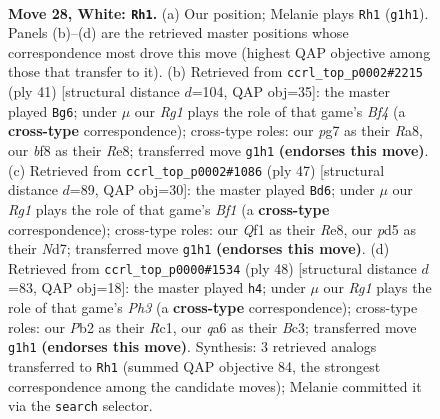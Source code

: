 \documentclass[11pt]{article}
\begin{document}
\clearpage

\begin{figure}[p]\centering
\begin{subfigure}{0.46\textwidth}\centering
\resizebox{\linewidth}{!}{%
\newchessgame
\chessboard[
  setfen={rk3b2/pp4pr/q1p1b2p/P2p1p2/3P3P/2B1PN2/1PK2PP1/1R3QR1 w - - 7 28},
  showmover=false,
  pgfstyle=straightmove, color=movearrow, markmove={g1-h1}
]}
\caption{}
\end{subfigure}\hfill
\begin{subfigure}{0.46\textwidth}\centering
\resizebox{\linewidth}{!}{%
\newchessgame
\chessboard[
  setfen={r3r1k1/p2q1pbp/1p1p1n2/P1pP1b1p/2P4B/2N2B2/1P1Q1PP1/R4RK1 b - - 0 21},
  showmover=false,
  pgfstyle=straightmove, color=movearrow, markmove={f5-g6}
]}
\caption{}
\end{subfigure}
\\[4pt]
\begin{subfigure}{0.46\textwidth}\centering
\resizebox{\linewidth}{!}{%
\newchessgame
\chessboard[
  setfen={r3rbk1/3n1p1p/1q4p1/p1pP4/1p3B2/1P2RB2/P1Q2PPP/5RK1 b - - 2 24},
  showmover=false,
  pgfstyle=straightmove, color=movearrow, markmove={f8-d6}
]}
\caption{}
\end{subfigure}\hfill
\begin{subfigure}{0.46\textwidth}\centering
\resizebox{\linewidth}{!}{%
\newchessgame
\chessboard[
  setfen={4rbk1/1q3pp1/r1p1pn1p/p2p4/N2P4/2B1P1PP/PPR1QPK1/2R5 w - - 7 25},
  showmover=false,
  pgfstyle=straightmove, color=movearrow, markmove={h3-h4}
]}
\caption{}
\end{subfigure}
\caption{\textbf{Move 28, White: \texttt{Rh1}.} (a) Our position; Melanie plays \texttt{Rh1} (\texttt{g1h1}). Panels (b)--(d) are the retrieved master positions whose correspondence most drove this move (highest QAP objective among those that transfer to it). (b) Retrieved from \texttt{ccrl\_top\_p0002\#2215} (ply 41) [structural distance $d$=104, QAP obj=35]: the master played \texttt{Bg6}; under $\mu$ our \emph{Rg1} plays the role of that game's \emph{Bf4} (a \textbf{cross-type} correspondence); cross-type roles: our \emph{p}g7 as their \emph{R}a8, our \emph{b}f8 as their \emph{R}e8; transferred move \texttt{g1h1} \textbf{(endorses this move)}. (c) Retrieved from \texttt{ccrl\_top\_p0002\#1086} (ply 47) [structural distance $d$=89, QAP obj=30]: the master played \texttt{Bd6}; under $\mu$ our \emph{Rg1} plays the role of that game's \emph{Bf1} (a \textbf{cross-type} correspondence); cross-type roles: our \emph{Q}f1 as their \emph{R}e8, our \emph{p}d5 as their \emph{N}d7; transferred move \texttt{g1h1} \textbf{(endorses this move)}. (d) Retrieved from \texttt{ccrl\_top\_p0000\#1534} (ply 48) [structural distance $d$=83, QAP obj=18]: the master played \texttt{h4}; under $\mu$ our \emph{Rg1} plays the role of that game's \emph{Ph3} (a \textbf{cross-type} correspondence); cross-type roles: our \emph{P}b2 as their \emph{R}c1, our \emph{q}a6 as their \emph{B}c3; transferred move \texttt{g1h1} \textbf{(endorses this move)}. Synthesis: 3 retrieved analogs transferred to \texttt{Rh1} (summed QAP objective 84, the strongest correspondence among the candidate moves); Melanie committed it via the \texttt{search} selector.}
\label{fig:thought-m54}
\end{figure}
\end{document}
